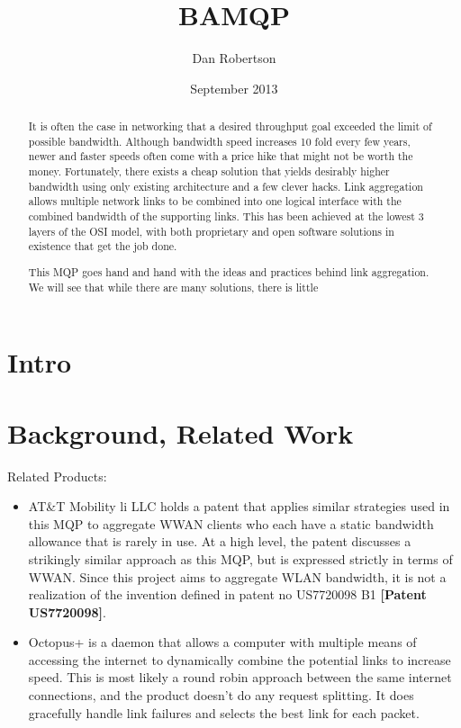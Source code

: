 \documentclass[12pt]{article}
\newcommand{\lcite}[1]
{{\bfseries\color{orange}[#1]}}
\begin{document}
\title{BAMQP}
\author{Dan Robertson}
\date{September 2013}
\maketitle

\begin{abstract}
	It is often the case in networking that a desired throughput goal exceeded the limit of possible bandwidth. Although bandwidth speed increases 10 fold every few years, newer and faster speeds often come with a price hike that might not be worth the money. Fortunately, there exists a cheap solution that yields desirably higher bandwidth using only existing architecture and a few clever hacks. Link aggregation allows multiple network links to be combined into one logical interface with the combined bandwidth of the supporting links. This has been achieved at the lowest 3 layers of the OSI model, with both proprietary and open software solutions in existence that get the job done.

	This MQP goes hand and hand with the ideas and practices behind link aggregation. We will see that while there are many solutions, there is little 
\end{abstract}



\section{Intro}


\section{Background, Related Work}

	Related Products:\begin{itemize}
		\item AT\&T Mobility li LLC holds a patent that applies similar strategies used in this MQP to aggregate WWAN clients who each have a static bandwidth allowance that is rarely in use. At a high level, the patent discusses a strikingly similar approach as this MQP, but is expressed strictly in terms of WWAN. Since this project aims to aggregate WLAN bandwidth, it is not a realization of the invention defined in patent no US7720098 B1 \lcite{Patent US7720098}.

		\item Octopus+ is a daemon that allows a computer with multiple means of accessing the internet to dynamically combine the potential links to increase speed. This is most likely a round robin approach between the same internet connections, and the product doesn't do any request splitting. It does gracefully handle link failures and selects the best link for each packet.
	\end{itemize}
\end{document}
